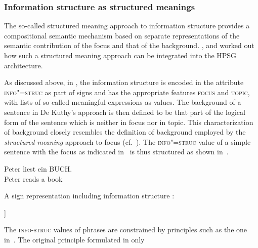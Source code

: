 \documentclass[output=paper]{langsci/langscibook}
\begin{document}
\subsubsection{Information structure as structured meanings \citep{deKuthy2002a}}
\label{sec:struc-meaning}
The so-called structured meaning approach to information structure
\citep{Stechow81a-u,Jacobs83a,Krifka92a-u-kopiert} provides a
compositional semantic mechanism based on separate representations of
the semantic contribution of the focus and that of the
background. \citet{deKuthy2002a}, \cite{dKM2003a} and
\cite{Webelhuth2007a-u} worked out how such a structured meaning
approach can be integrated into the HPSG architecture.

As discussed above, in \cite{deKuthy2002a}, the information structure
is encoded in the attribute \textsc{info"=struc} as part of signs and
has the appropriate features \textsc{focus} and \textsc{topic}, with
lists of so-called meaningful expressions as values. The background of
a sentence in De Kuthy's approach is then defined to be that part of
the logical form of the sentence which is neither in focus nor in
topic.  This characterization of background closely resembles the
definition of background employed by the \textit{structured meaning}
approach to focus (cf.\ \citealt{Krifka92a-u-kopiert}).  The
\textsc{info"=struc} value of a simple sentence with the focus as
indicated in~ is thus structured as shown
in~.
\begin{exe}
  \ex\label{ex:peter} \gll Peter {\LF}liest ein BUCH{\RF}.\\
           Peter {}reads a book\\
\end{exe}
\ea
 A sign representation including information structure \citep[163]{deKuthy2002a}:
\begin{center}
    \begin{avm}
      [s|loc|cont|lf  $\exists x \[book'\(x\) \wedge read'\(p,x\)\]$\\
       info-struc  [focus & \XlstI{$\lambda y \exists x\[book'\(x\) \wedge read'\(y,x\)\]$}\\
                     topic & \elst]
      ]
    \end{avm}

    \label{fig:focus-backgr}
  \end{center}\unskip
\z
The \textsc{info-struc} values of phrases are constrained by
principles such as the one in~. The
original principle formulated in \cite[169]{deKuthy2002a} only
\end{document}
